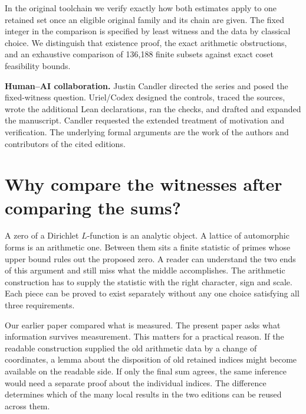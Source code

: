 \documentclass[12pt,letterpaper]{article}
\begin{document}
In the original toolchain we verify exactly how both estimates apply to one retained set once an eligible original family and its chain are given. The fixed integer in the comparison is specified by least witness and the data by classical choice. We distinguish that existence proof, the exact arithmetic obstructions, and an exhaustive comparison of 136,188 finite subsets against exact coset feasibility bounds.

\medskip\textbf{Human--AI collaboration.} Justin Candler directed the series and posed the fixed-witness question. Uriel/Codex designed the controls, traced the sources, wrote the additional Lean declarations, ran the checks, and drafted and expanded the manuscript. Candler requested the extended treatment of motivation and verification. The underlying formal arguments are the work of the authors and contributors of the cited editions.
\clearpage\begingroup\small\setlength{\parskip}{0pt}\tableofcontents\endgroup
\clearpage{}
\section{Why compare the witnesses after comparing the sums?}\label{sec:architecture}
A zero of a Dirichlet $L$-function is an analytic object. A lattice of automorphic forms is an arithmetic one. Between them sits a finite statistic of primes whose upper bound rules out the proposed zero. A reader can understand the two ends of this argument and still miss what the middle accomplishes. The arithmetic construction has to supply the statistic with the right character, sign and scale. Each piece can be proved to exist separately without any one choice satisfying all three requirements.

Our earlier paper compared what is measured. The present paper asks what information survives measurement. This matters for a practical reason. If the readable construction supplied the old arithmetic data by a change of coordinates, a lemma about the disposition of old retained indices might become available on the readable side. If only the final sum agrees, the same inference would need a separate proof about the individual indices. The difference determines which of the many local results in the two editions can be reused across them.
\end{document}
